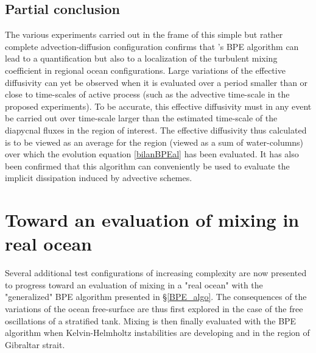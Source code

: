 \subsection{Partial conclusion}
The various experiments carried out in the frame of this simple but rather complete advection-diffusion configuration confirms that \cite{winters_available_1995}'s BPE algorithm can lead to a quantification but also to a localization of the turbulent mixing coefficient in regional ocean configurations. Large variations of the effective diffusivity can yet be observed when it is evaluated over a period smaller than or close to time-scales of active process (such as the advective time-scale in the proposed experiments). To be accurate, this effective diffusivity must in any event be carried out over time-scale larger than the estimated time-scale of the diapycnal fluxes in the region of interest. The effective diffusivity thus calculated is to be viewed as an average for the region (viewed as a sum of water-columns) over which the evolution equation \ref{bilanBPEal} has been evaluated. It has also been confirmed that this algorithm can conveniently be used to evaluate the implicit dissipation induced by advective schemes.

\section{Toward an evaluation of mixing in real ocean}
\label{section_CROCO_BPE}
Several additional test configurations of increasing complexity are now presented to progress toward an evaluation of mixing in a "real ocean" with the "generalized" BPE algorithm presented in \S \ref{BPE_algo}. The consequences of the variations of the ocean free-surface are thus first explored in the case of the free oscillations of a stratified tank. Mixing is then finally evaluated with the BPE algorithm when Kelvin-Helmholtz instabilities are developing and in the region of Gibraltar strait.

